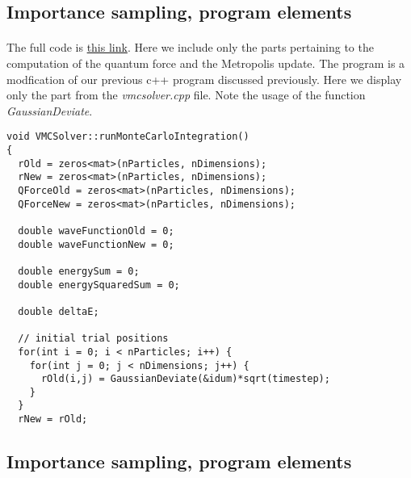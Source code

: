 \documentclass[%
twoside,                 %
final,                   %
10pt]{article}
\begin{document}
\subsection*{Importance sampling, program elements}

\paragraph{}
The full code is \href{{https://github.com/CompPhysics/ComputationalPhysics2/tree/gh-pages/doc/pub/vmc/programs/c%
\begin{verbatim}
void VMCSolver::runMonteCarloIntegration()
{
  rOld = zeros<mat>(nParticles, nDimensions);
  rNew = zeros<mat>(nParticles, nDimensions);
  QForceOld = zeros<mat>(nParticles, nDimensions);
  QForceNew = zeros<mat>(nParticles, nDimensions);

  double waveFunctionOld = 0;
  double waveFunctionNew = 0;

  double energySum = 0;
  double energySquaredSum = 0;

  double deltaE;

  // initial trial positions
  for(int i = 0; i < nParticles; i++) {
    for(int j = 0; j < nDimensions; j++) {
      rOld(i,j) = GaussianDeviate(&idum)*sqrt(timestep);
    }
  }
  rNew = rOld;
\end{verbatim}


\subsection*{Importance sampling, program elements}

\end{document}
